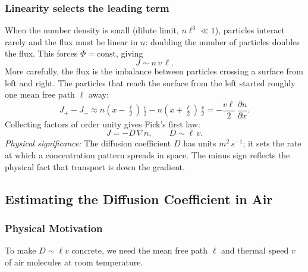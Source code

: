 \subsubsection*{Linearity selects the leading term}
When the number density is small (dilute limit, $n\ell^3 \ll 1$), particles
interact rarely and the flux must be linear in $n$: doubling the number of
particles doubles the flux. This forces $\Phi = \text{const}$, giving
\begin{equation}
    J \sim n\,v\,\ell .
    \label{eq:lec06:J-linear}
\end{equation}
More carefully, the flux is the imbalance between particles crossing a surface
from left and right. The particles that reach the surface from the left started
roughly one mean free path $\ell$ away:
\begin{equation}
    J_+ - J_- \approx n\!\left(x-\tfrac{\ell}{2}\right)\,\tfrac{v}{2}
    - n\!\left(x+\tfrac{\ell}{2}\right)\,\tfrac{v}{2}
    = -\frac{v\ell}{2}\,\frac{\partial n}{\partial x} .
    \label{eq:lec06:flux-imbalance}
\end{equation}
Collecting factors of order unity gives Fick's first law:
\begin{equation}
    \boxed{
    J = -D\,\nabla n,
    \qquad D \sim \ell\,v .
    }
    \label{eq:lec06:ficks-first-law}
\end{equation}
\textit{Physical significance:} The diffusion coefficient $D$ has units
$\si{m^2\,s^{-1}}$; it sets the rate at which a concentration pattern spreads
in space. The minus sign reflects the physical fact that transport is down the
gradient.

\subsection{Estimating the Diffusion Coefficient in Air}
\label{sec:lec06:D-estimate}

\subsubsection*{Physical Motivation}
To make $D \sim \ell v$ concrete, we need the mean free path $\ell$ and
thermal speed $v$ of air molecules at room temperature.

